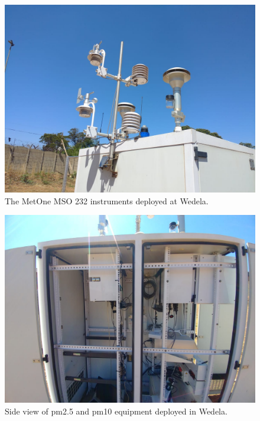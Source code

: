\documentclass{nwureport}
\begin{document}
\begin{figure}[!htb]
    \centering
    \includegraphics[width=\textwidth]{images/wedela.jpeg}
    \caption[Meteorological equipment deployed at Wedela.]{The MetOne MSO 232 instruments deployed at Wedela.}
    \label{fig:wadela_instruments_met}
\end{figure}

\begin{figure}[!htb]
    \centering
    \includegraphics[width=\textwidth]{images/wadela_10.jpeg}
    \caption[Side view of $PM_{2.5}$ and $PM_{10}$ equipment deployed in Wedela.]{Side view of \gls{pm2.5} and \gls{pm10} equipment deployed in Wedela.}
    \label{fig:wadela_instruments_pm}
\end{figure}
\end{document}
